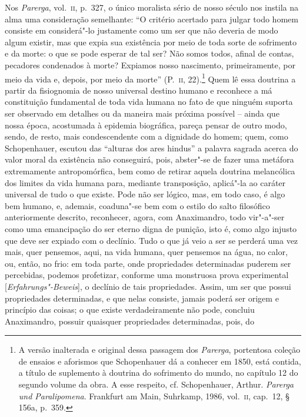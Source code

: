 Nos \textit{Parerga}, vol.~\textsc{ii}, p.~327, o único moralista sério de nosso
século nos instila na alma uma consideração semelhante: ``O critério
acertado para julgar todo homem consiste em considerá"-lo justamente
como um ser que não deveria de modo algum existir, mas que expia sua
existência por meio de toda sorte de sofrimento e da morte: o que se
pode esperar de tal ser? Não somos todos, afinal de contas, pecadores
condenados à morte? Expiamos nosso nascimento, primeiramente, por meio
da vida e, depois, por meio da morte'' (P.~\textsc{ii}, 22).\footnote{ A versão
inalterada e original dessa passagem dos \textit{Parerga}, portentosa
coleção de ensaios e aforismos que Schopenhauer dá a conhecer em 1850,
está contida, a título de suplemento à doutrina do sofrimento do mundo,
no capítulo 12 do segundo volume da obra. A esse respeito, cf.
Schopenhauer, Arthur. \textit{Parerga und Paralipomena}. Frankfurt am
Main, Suhrkamp, 1986, vol.~\textsc{ii}, cap.~12,  § 156a, p.~359.} Quem lê
essa doutrina a partir da fisiognomia de nosso universal destino humano
e reconhece a má constituição fundamental de toda vida humana no fato
de que ninguém suporta ser observado em detalhes ou da maneira mais
próxima possível -- ainda que nossa época, acostumada à epidemia
biográfica, pareça pensar de outro modo, sendo, de resto, mais
condescendente com a dignidade do homem; quem, como Schopenhauer,
escutou das ``alturas dos ares hindus'' a palavra sagrada acerca do valor
moral da existência não conseguirá, pois, abster"-se de fazer uma
metáfora extremamente antropomórfica, bem como de retirar aquela
doutrina melancólica dos limites da vida humana para, mediante
transposição, aplicá"-la ao caráter universal de tudo o que existe. Pode
não ser lógico, mas, em todo caso, é algo bem humano, e, ademais,
coaduna"-se bem com o estilo do salto filosófico anteriormente descrito,
reconhecer, agora, com Anaximandro, todo vir"-a"-ser como uma emancipação \label{sereterno}
do ser eterno digna de punição, isto é, como algo injusto que deve ser
expiado com o declínio. Tudo o que já veio a ser se perderá uma vez
mais, quer pensemos, aqui, na vida humana, quer pensemos na água, no
calor, ou, então, no frio: em toda parte, onde propriedades
determinadas puderem ser percebidas, podemos profetizar, conforme uma
monstruosa prova experimental [\textit{Erfahrungs"-Beweis}], o declínio
de tais propriedades. Assim, um ser que possui propriedades
determinadas, e que nelas consiste, jamais poderá ser origem e princípio
das coisas; o que existe verdadeiramente não pode, concluiu
Anaximandro, possuir quaisquer propriedades determinadas, pois, do
